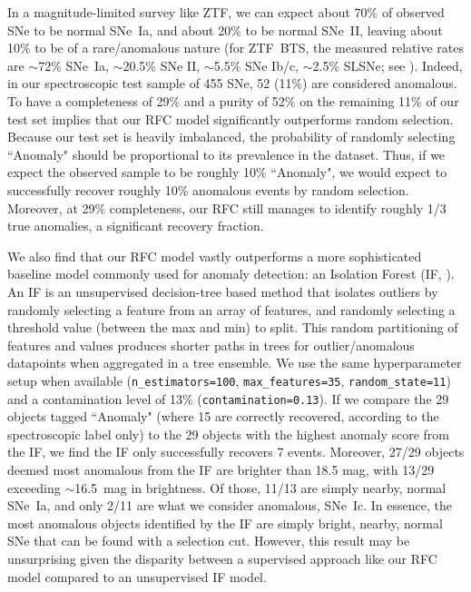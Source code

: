 \documentclass[twocolumn]{aastex63}
\begin{document}
In a magnitude-limited survey like ZTF, we can expect about 70\% of observed SNe to be normal SNe~Ia, and about 20\% to be normal SNe~II, leaving about 10\% to be of a rare/anomalous nature (for ZTF~BTS, the measured relative rates are $\sim$72\% SNe~Ia, $\sim$20.5\% SNe II, $\sim$5.5\% SNe Ib/c, $\sim$2.5\% SLSNe; see \citealt{Fremling2020}). Indeed, in our spectroscopic test sample of 455 SNe, 52 (11\%) are considered anomalous. To have a completeness of 29\% and a purity of 52\% on the remaining 11\% of our test set implies that our RFC model significantly outperforms random selection. Because our test set is heavily imbalanced, the probability of randomly selecting ``Anomaly" should be proportional to its prevalence in the dataset. Thus, if we expect the observed sample to be roughly 10\% ``Anomaly", we would expect to successfully recover roughly 10\% anomalous events by random selection. Moreover, at 29\% completeness, our RFC still manages to identify roughly 1/3 true anomalies, a significant recovery fraction.  \par

We also find that our RFC model vastly outperforms a more sophisticated baseline model commonly used for anomaly detection: an Isolation Forest (IF, \citealt{Liu2012}). An IF is an unsupervised decision-tree based method that isolates outliers by randomly selecting a feature from an array of features, and randomly selecting a threshold value (between the max and min) to split. This random partitioning of features and values produces shorter paths in trees for outlier/anomalous datapoints when aggregated in a tree ensemble. We use the same hyperparameter setup when available (\texttt{n\_estimators=100}, \texttt{max\_features=35}, \texttt{random\_state=11}) and a contamination level of 13\% (\texttt{contamination=0.13}). If we compare the 29 objects tagged ``Anomaly" (where 15 are correctly recovered, according to the spectroscopic label only) to the 29 objects with the highest anomaly score from the IF, we find the IF only successfully recovers 7 events. Moreover, 27/29 objects deemed most anomalous from the IF are brighter than 18.5 mag, with 13/29 exceeding $\sim$16.5~mag in brightness. Of those, 11/13 are simply nearby, normal SNe~Ia, and only 2/11 are what we consider anomalous, SNe~Ic. In essence, the most anomalous objects identified by the IF are simply bright, nearby, normal SNe that can be found with a selection cut. However, this result may be unsurprising given the disparity between a supervised approach like our RFC model compared to an unsupervised IF model. \par 
\end{document}
